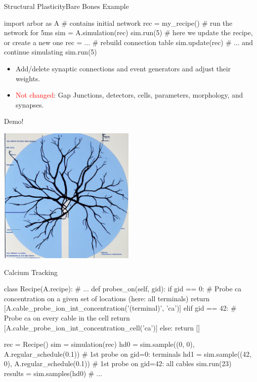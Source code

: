 \documentclass{beamer}
\begin{document}
\begin{frame}[fragile]{Structural Plasticity}{Bare Bones Example}
\begin{codePythonblock}
  import arbor as A
  # contains initial network
  rec = my_recipe()
  # run the network for 5ms
  sim = A.simulation(rec)
  sim.run(5)
  # here we update the recipe, or create a new one
  rec = ...
  # rebuild connection table
  sim.update(rec)
  # ... and continue simulating
  sim.run(5)
\end{codePythonblock}
\begin{itemize}
  \item Add/delete synaptic connections and event generators and adjust their weights.
  \item \textcolor{red}{Not changed}: Gap Junctions, detectors, cells, parameters, morphology, and synapses.
\end{itemize}
\end{frame}

\begin{frame}{Demo!}
  \begin{center}
    \includegraphics[width=0.5\textwidth]{images/neuron-2}
  \end{center}
\end{frame}

\begin{frame}[fragile]{Calcium Tracking}
  \begin{codePythonblock}
    class Recipe(A.recipe):
        # ...
        def probes_on(self, gid):
            if gid == 0:
                # Probe ca concentration on a given set of locations (here: all terminals)
                return [A.cable_probe_ion_int_concentration('(terminal)', 'ca')]
            elif gid == 42:
                # Probe ca on every cable in the cell
                return [A.cable_probe_ion_int_concentration_cell('ca')]
            else:
                return []

    rec = Recipe()
    sim = simulation(rec)
    hd0 = sim.sample((0, 0), A.regular_schedule(0.1))  # 1st probe on gid=0: terminals
    hd1 = sim.sample((42, 0), A.regular_schedule(0.1)) # 1st probe on gid=42: all cables
    sim.run(23)
    results = sim.samples(hd0)
    # ...
  \end{codePythonblock}
\end{frame}
\end{document}
